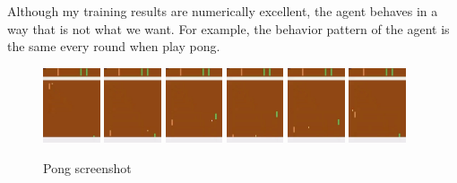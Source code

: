 \documentclass{article}
\begin{document}
Although my training results are numerically excellent, the agent behaves in a way that is not what we want. For example, the behavior pattern of the agent is the same every round when play pong.

\begin{figure}[H]
\centering
\includegraphics[width=0.15\textwidth]{img/frame_007_delay-0.1s.jpg}
\includegraphics[width=0.15\textwidth]{img/frame_015_delay-0.1s.jpg}
\includegraphics[width=0.15\textwidth]{img/frame_017_delay-0.1s.jpg}
\includegraphics[width=0.15\textwidth]{img/frame_019_delay-0.1s.jpg}
\includegraphics[width=0.15\textwidth]{img/frame_020_delay-0.1s.jpg}
\includegraphics[width=0.15\textwidth]{img/frame_022_delay-0.1s.jpg}
\caption{Pong screenshot}
\label{Fig.main2}
\end{figure}
\end{document}
